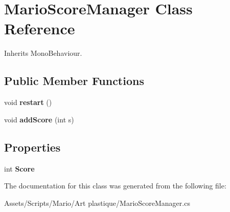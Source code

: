 \hypertarget{class_mario_score_manager}{\section{Mario\-Score\-Manager Class Reference}
\label{class_mario_score_manager}
}


Inherits Mono\-Behaviour.

\subsection*{Public Member Functions}
\begin{DoxyCompactItemize}
\item 
\hypertarget{class_mario_score_manager_a25d6f655e29344243d197228383d7d0b}{void {\bfseries restart} ()}\label{class_mario_score_manager_a25d6f655e29344243d197228383d7d0b}

\item 
\hypertarget{class_mario_score_manager_a0b633f309bea90e4fa81dbb913827c74}{void {\bfseries add\-Score} (int s)}\label{class_mario_score_manager_a0b633f309bea90e4fa81dbb913827c74}

\end{DoxyCompactItemize}
\subsection*{Properties}
\begin{DoxyCompactItemize}
\item 
\hypertarget{class_mario_score_manager_a4d0509d8c3fd880a018591dc0a9e1ccd}{int {\bfseries Score}}\label{class_mario_score_manager_a4d0509d8c3fd880a018591dc0a9e1ccd}

\end{DoxyCompactItemize}


The documentation for this class was generated from the following file\-:\begin{DoxyCompactItemize}
\item 
Assets/\-Scripts/\-Mario/\-Art plastique/Mario\-Score\-Manager.\-cs\end{DoxyCompactItemize}
